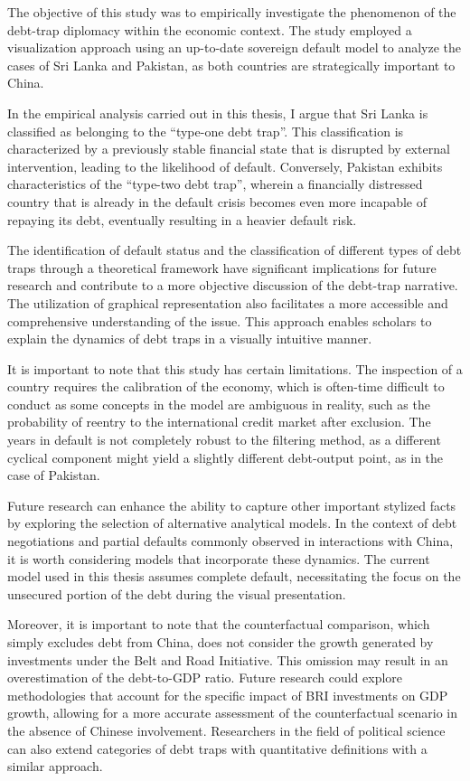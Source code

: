 The objective of this study was to empirically investigate the phenomenon of the debt-trap diplomacy within the economic context. The study employed a visualization approach using an up-to-date sovereign default model to analyze the cases of Sri Lanka and Pakistan, as both countries are strategically important to China.

In the empirical analysis carried out in this thesis, I argue that Sri Lanka is classified as belonging to the ``type-one debt trap''. This classification is characterized by a previously stable financial state that is disrupted by external intervention, leading to the likelihood of default. Conversely, Pakistan exhibits characteristics of the ``type-two debt trap'', wherein a financially distressed country that is already in the default crisis becomes even more incapable of repaying its debt, eventually resulting in a heavier default risk.

The identification of default status and the classification of different types of debt traps through a theoretical framework have significant implications for future research and contribute to a more objective discussion of the debt-trap narrative. The utilization of graphical representation also facilitates a more accessible and comprehensive understanding of the issue. This approach enables scholars to explain the dynamics of debt traps in a visually intuitive manner.

It is important to note that this study has certain limitations. The inspection of a country requires the calibration of the economy, which is often-time difficult to conduct as some concepts in the model are ambiguous in reality, such as the probability of reentry to the international credit market after exclusion. The years in default is not completely robust to the filtering method, as a different cyclical component might yield a slightly different debt-output point, as in the case of Pakistan.

Future research can enhance the ability to capture other important stylized facts by exploring the selection of alternative analytical models. In the context of debt negotiations and partial defaults commonly observed in interactions with China, it is worth considering models that incorporate these dynamics. The current model used in this thesis assumes complete default, necessitating the focus on the unsecured portion of the debt during the visual presentation.

Moreover, it is important to note that the counterfactual comparison, which simply excludes debt from China, does not consider the growth generated by investments under the Belt and Road Initiative. This omission may result in an overestimation of the debt-to-GDP ratio. Future research could explore methodologies that account for the specific impact of BRI investments on GDP growth, allowing for a more accurate assessment of the counterfactual scenario in the absence of Chinese involvement. Researchers in the field of political science can also extend categories of debt traps with quantitative definitions with a similar approach.